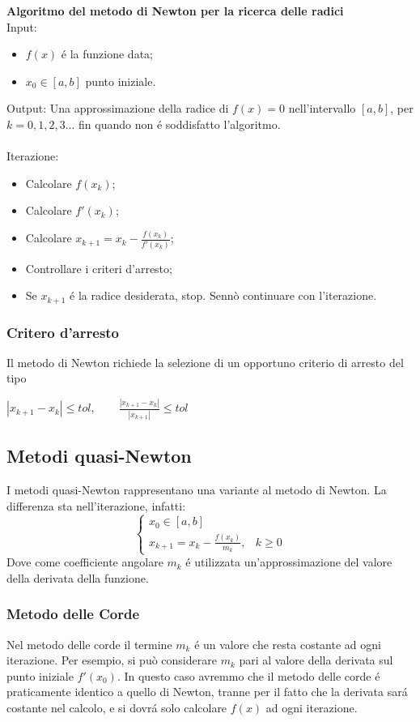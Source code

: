 \documentclass[12pt, letterpaper]{article}
\begin{document}
\textbf{Algoritmo del metodo di Newton per la ricerca delle radici}\\
Input:
\begin{itemize}
    \item $f(x)$ \'e la funzione data; 
    \item $x_0 \in [a,b]$ punto iniziale.
\end{itemize}
Output: Una approssimazione della radice di $f(x)=0$ nell'intervallo $[a,b]$, per $k=0,1,2,3...$ fin quando non \'e soddisfatto l'algoritmo. \\~\\
Iterazione:
\begin{itemize}
    \item Calcolare $f(x_k)$;
    \item Calcolare $f'(x_k)$;
    \item Calcolare $x_{k+1}=x_k-\frac{f(x_k)}{f'(x_k)}$;
    \item Controllare i criteri d'arresto;
    \item Se $x_{k+1}$ \'e la radice desiderata, stop. Sennò continuare con l'iterazione.
\end{itemize}

\subsubsection{Critero d'arresto}
Il metodo di Newton richiede la selezione di un opportuno criterio di arresto del tipo
\begin{center}
    $|x_{k+1}-x_k| \leq tol, \qquad \frac{|x_{k+1}-x_k|}{|x_{k+1}|} \leq tol $
\end{center}

\subsection{Metodi quasi-Newton}
I metodi quasi-Newton rappresentano una variante al metodo di Newton. La differenza sta nell'iterazione, infatti:
\begin{equation}
\begin{cases}
    x_0 \in [a,b]\\
    x_{k+1} = x_k-\frac{f(x_k)}{m_k},& k\geq0
\end{cases}
\end{equation}
Dove come coefficiente angolare $m_k$ \'e utilizzata un'approssimazione del valore della derivata della funzione.
\subsubsection{Metodo delle Corde}
Nel metodo delle corde il termine $m_k$ \'e un valore che resta costante ad ogni iterazione. Per esempio, si può considerare $m_k$ pari al valore della derivata sul punto iniziale $f'(x_0)$.
In questo caso avremmo che il metodo delle corde \'e praticamente identico a quello di Newton, tranne per il fatto che la derivata sar\'a costante nel calcolo, e si dovr\'a solo calcolare $f(x)$ ad ogni iterazione.
\end{document}
